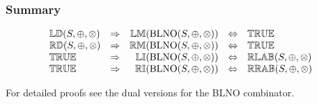 \documentclass[../Summary.tex]{subfiles}
\begin{document}
\subsubsection{Summary}

\[
\begin{array}{lcrcl} 
\propname{LD}(S, \oplus, \otimes)
	& \Rightarrow
	& \propname{LM}(\mathrm{BLNO}(S,\oplus,\otimes))
    & \Leftrightarrow
    & \propname{TRUE} \\
\propname{RD}(S, \oplus, \otimes)
	& \Rightarrow
	& \propname{RM}(\mathrm{BLNO}(S,\oplus,\otimes))
    & \Leftrightarrow %
    & \propname{TRUE} \\
\propname{TRUE}
	& \Rightarrow
	& \propname{LI}(\mathrm{BLNO}(S,\oplus,\otimes))
    & \Leftrightarrow %
    & \propname{RLAB}(S,\oplus,\otimes) \\ 
\propname{TRUE}
	& \Rightarrow
	& \propname{RI}(\mathrm{BLNO}(S,\oplus,\otimes))
    & \Leftrightarrow %
    & \propname{RRAB}(S,\oplus,\otimes) \\
\end{array} 
\] 

For detailed proofs see the dual versions for the BLNO combinator.
\end{document}
